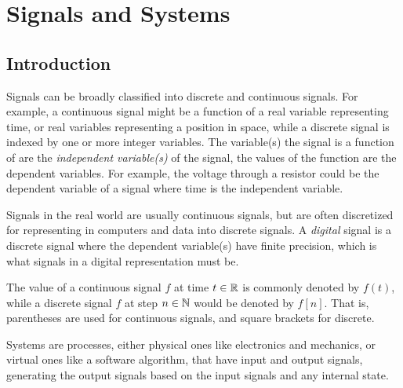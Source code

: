 
\chapter{Signals and Systems}
\label{ch:signals}

\section{Introduction}

Signals can be broadly classified into discrete and continuous signals. For example, a continuous signal might be a function of a real variable representing time, or real variables representing a position in space, while a discrete signal is indexed by one or more integer variables. The variable(s) the signal is a function of are the \emph{independent variable(s)} of the signal, the values of the function are the dependent variables. For example, the voltage through a resistor could be the dependent variable of a signal where time is the independent variable.

Signals in the real world are usually continuous signals, but are often discretized for representing in computers and data into discrete signals. A \emph{digital} signal is a discrete signal where the dependent variable(s) have finite precision, which is what signals in a digital representation must be.

The value of a continuous signal $f$ at time $t \in \mathbb{R}$ is commonly denoted by $f(t)$, while a discrete signal $f$ at step $n \in \mathbb{N}$ would be denoted by $f[n]$. That is, parentheses are used for continuous signals, and square brackets for discrete.

Systems are processes, either physical ones like electronics and mechanics, or virtual ones like a software algorithm, that have input and output signals, generating the output signals based on the input signals and any internal state.

